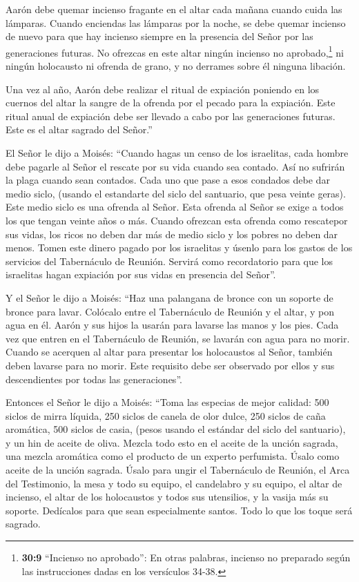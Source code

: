 Aarón debe quemar incienso fragante en el altar cada mañana
cuando cuida las lámparas.  Cuando enciendas las lámparas
por la noche, se debe quemar incienso de nuevo para que hay incienso
siempre en la presencia del Señor por las generaciones futuras.
 No ofrezcas en este altar ningún incienso no
aprobado,\footnote{\textbf{30:9} ``Incienso no aprobado'': En otras
  palabras, incienso no preparado según las instrucciones dadas en los
  versículos 34-38.} ni ningún holocausto ni ofrenda de grano, y no
derrames sobre él ninguna libación.

 Una vez al año, Aarón debe realizar el ritual de expiación
poniendo en los cuernos del altar la sangre de la ofrenda por el pecado
para la expiación. Este ritual anual de expiación debe ser llevado a
cabo por las generaciones futuras. Este es el altar sagrado del Señor.''

 El Señor le dijo a Moisés:  ``Cuando hagas un
censo de los israelitas, cada hombre debe pagarle al Señor el rescate
por su vida cuando sea contado. Así no sufrirán la plaga cuando sean
contados.  Cada uno que pase a esos condados debe dar medio
siclo, (usando el estandarte del siclo del santuario, que pesa veinte
geras). Este medio siclo es una ofrenda al Señor.  Esta
ofrenda al Señor se exige a todos los que tengan veinte años o más.
 Cuando ofrezcan esta ofrenda como rescatepor sus vidas,
los ricos no deben dar más de medio siclo y los pobres no deben dar
menos.  Tomen este dinero pagado por los israelitas y
úsenlo para los gastos de los servicios del Tabernáculo de Reunión.
Servirá como recordatorio para que los israelitas hagan expiación por
sus vidas en presencia del Señor''.

 Y el Señor le dijo a Moisés:  ``Haz una
palangana de bronce con un soporte de bronce para lavar. Colócalo entre
el Tabernáculo de Reunión y el altar, y pon agua en él. 
Aarón y sus hijos la usarán para lavarse las manos y los pies.
 Cada vez que entren en el Tabernáculo de Reunión, se
lavarán con agua para no morir. Cuando se acerquen al altar para
presentar los holocaustos al Señor,  también deben lavarse
para no morir. Este requisito debe ser observado por ellos y sus
descendientes por todas las generaciones''.

 Entonces el Señor le dijo a Moisés:  ``Toma
las especias de mejor calidad: 500 siclos de mirra líquida, 250 siclos
de canela de olor dulce, 250 siclos de caña aromática,  500
siclos de casia, (pesos usando el estándar del siclo del santuario), y
un hin de aceite de oliva.  Mezcla todo esto en el aceite
de la unción sagrada, una mezcla aromática como el producto de un
experto perfumista. Úsalo como aceite de la unción sagrada.
 Úsalo para ungir el Tabernáculo de Reunión, el Arca del
Testimonio,  la mesa y todo su equipo, el candelabro y su
equipo, el altar de incienso,  el altar de los holocaustos
y todos sus utensilios, y la vasija más su soporte. 
Dedícalos para que sean especialmente santos. Todo lo que los toque será
sagrado.

